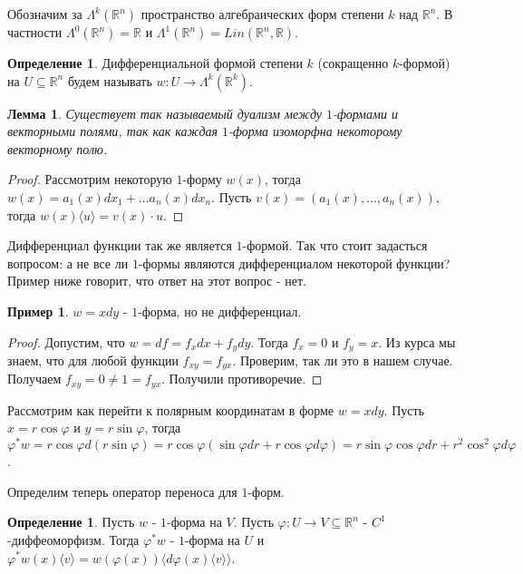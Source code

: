 \documentclass[a5paper]{article}
\newcounter{through}
\theoremstyle{plain}
\newtheorem{lemma}[through]{Лемма}
\theoremstyle{definition}
\newtheorem{definition}[through]{Определение}
\newtheorem{example}[through]{Пример}
\numberwithin{through}{section}
\numberwithin{equation}{section}
\begin{document}
Обозначим за $\Lambda^k(\mathbb{R}^n)$ пространство алгебраических форм степени $k$ над $\mathbb{R}^n$. В частности $\Lambda^0(\mathbb{R}^n)=\mathbb{R}$ и $\Lambda^1(\mathbb{R}^n)=Lin(\mathbb{R}^n, \mathbb{R})$.

\begin{definition}
	Дифференциальной формой степени $k$ (сокращенно $k$-формой) на $U \subseteq \mathbb{R}^n$ будем называть $w : U \to \Lambda^k(\mathbb{R}^k)$.
\end{definition}

\begin{lemma}
	Существует так называемый дуализм между $1$-формами и векторными полями, так как каждая $1$-форма изоморфна некоторому векторному полю.
\end{lemma}

\begin{proof}
	Рассмотрим некоторую $1$-форму $w(x)$, тогда $w(x)=a_1(x) dx_1 + \ldots a_n(x) dx_n$. Пусть $v(x) = (a_1(x), \ldots, a_n(x))$, тогда $w(x) \langle u \rangle = v(x) \cdot u$. 
\end{proof}

Дифференциал функции так же является $1$-формой. Так что стоит задасться вопросом: а не все ли $1$-формы являются дифференциалом некоторой функции? Пример ниже говорит, что ответ на этот вопрос - нет.

\begin{example}
	$w=xdy$ - $1$-форма, но не дифференциал.
\end{example}

\begin{proof}
	Допустим, что $w=df=f_x dx + f_y dy$. Тогда $f_x = 0$ и $f_y = x$. Из курса мы знаем, что для любой функции $f_{xy}=f_{yx}$. Проверим, так ли это в нашем случае. Получаем $f_{xy} = 0 \not = 1 = f_{yx}$. Получили противоречие.
\end{proof}

Рассмотрим как перейти к полярным координатам в форме 	$w=xdy$. Пусть $x = r \cos\varphi$ и $y = r \sin\varphi$, тогда $\varphi^* w = r\cos\varphi d(r\sin\varphi) = r\cos\varphi(\sin\varphi dr + r\cos\varphi d\varphi)=r\sin\varphi\cos\varphi dr + r^2 \cos^2 \varphi d \varphi$.

Определим теперь оператор переноса для $1$-форм.

\begin{definition}
	Пусть $w$ - $1$-форма на $V$. Пусть $\varphi : U \to V \subseteq \mathbb{R}^n$ - $C^1$-диффеоморфизм. Тогда $\varphi^{*}w$ - $1$-форма на $U$ и $\varphi^{*} w(x) \langle v \rangle = w(\varphi(x)) \langle d \varphi(x) \langle v \rangle \rangle$.
\end{definition}
\end{document}
